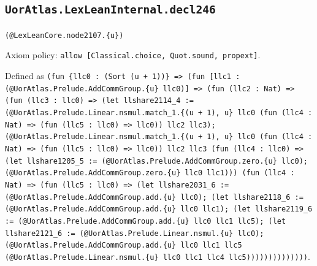 \documentclass[11pt]{article}
\begin{document}
\subsection*{\texttt{UorAtlas.LexLeanInternal.decl246}}
\noindent\texttt{(@LexLeanCore.node2107.\{u\})}\par
\noindent Axiom policy: \texttt{allow [Classical.choice, Quot.sound, propext]}.\par
\noindent Defined as \texttt{(fun \{llc0 : (Sort (u + 1))\} => (fun [llc1 : (@UorAtlas.Prelude.AddCommGroup.\{u\} llc0)] => (fun (llc2 : Nat) => (fun (llc3 : llc0) => (let llshare2114\_4 := (@UorAtlas.Prelude.Linear.nsmul.match\_1.\{(u + 1), u\} llc0 (fun (llc4 : Nat) => (fun (llc5 : llc0) => llc0)) llc2 llc3); (@UorAtlas.Prelude.Linear.nsmul.match\_1.\{(u + 1), u\} llc0 (fun (llc4 : Nat) => (fun (llc5 : llc0) => llc0)) llc2 llc3 (fun (llc4 : llc0) => (let llshare1205\_5 := (@UorAtlas.Prelude.AddCommGroup.zero.\{u\} llc0); (@UorAtlas.Prelude.AddCommGroup.zero.\{u\} llc0 llc1))) (fun (llc4 : Nat) => (fun (llc5 : llc0) => (let llshare2031\_6 := (@UorAtlas.Prelude.AddCommGroup.add.\{u\} llc0); (let llshare2118\_6 := (@UorAtlas.Prelude.AddCommGroup.add.\{u\} llc0 llc1); (let llshare2119\_6 := (@UorAtlas.Prelude.AddCommGroup.add.\{u\} llc0 llc1 llc5); (let llshare2121\_6 := (@UorAtlas.Prelude.Linear.nsmul.\{u\} llc0); (@UorAtlas.Prelude.AddCommGroup.add.\{u\} llc0 llc1 llc5 (@UorAtlas.Prelude.Linear.nsmul.\{u\} llc0 llc1 llc4 llc5))))))))))))))}.\par
\end{document}
